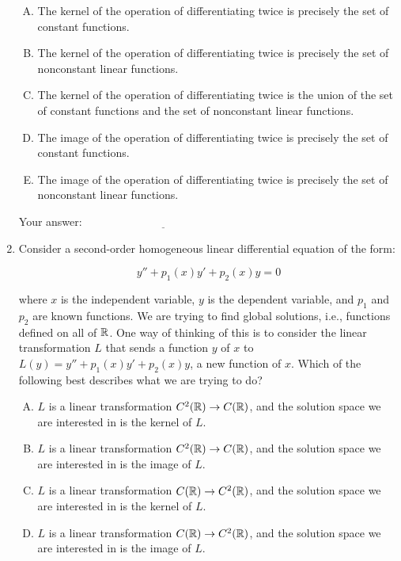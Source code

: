 \documentclass[10pt]{amsart}
\begin{document}
\begin{enumerate}
  \begin{enumerate}[(A)]
  \item The kernel of the operation of differentiating twice is
    precisely the set of constant functions.
  \item The kernel of the operation of differentiating twice is
    precisely the set of nonconstant linear functions.
  \item The kernel of the operation of differentiating twice is the
    union of the set of constant functions and the set of nonconstant
    linear functions.
  \item The image of the operation of differentiating twice is
    precisely the set of constant functions.
  \item The image of the operation of differentiating twice is
    precisely the set of nonconstant linear functions.
  \end{enumerate}

  \vspace{0.1in}
  Your answer: $\underline{\qquad\qquad\qquad\qquad\qquad\qquad\qquad}$
  \vspace{0.1in}

\item Consider a second-order homogeneous linear differential equation
  of the form:

  $$y'' + p_1(x)y' + p_2(x)y = 0$$

  where $x$ is the independent variable, $y$ is the dependent
  variable, and $p_1$ and $p_2$ are known functions. We are trying to
  find global solutions, i.e., functions defined on all of $\mathbb{R}$. One
  way of thinking of this is to consider the linear transformation $L$
  that sends a function $y$ of $x$ to $L(y) = y'' + p_1(x)y' +
  p_2(x)y$, a new function of $x$. Which of the following best
  describes what we are trying to do?

  \begin{enumerate}[(A)]
  \item $L$ is a linear transformation $C^2(\mathbb{R}) \to C(\mathbb{R})$, and the
    solution space we are interested in is the kernel of $L$.
  \item $L$ is a linear transformation $C^2(\mathbb{R}) \to C(\mathbb{R})$, and the
    solution space we are interested in is the image of $L$.
  \item $L$ is a linear transformation $C(\mathbb{R}) \to C^2(\mathbb{R})$, and the
    solution space we are interested in is the kernel of $L$.
  \item $L$ is a linear transformation $C(\mathbb{R}) \to C^2(\mathbb{R})$, and the
    solution space we are interested in is the image of $L$.
  \end{enumerate}


\end{enumerate}
\end{document}
